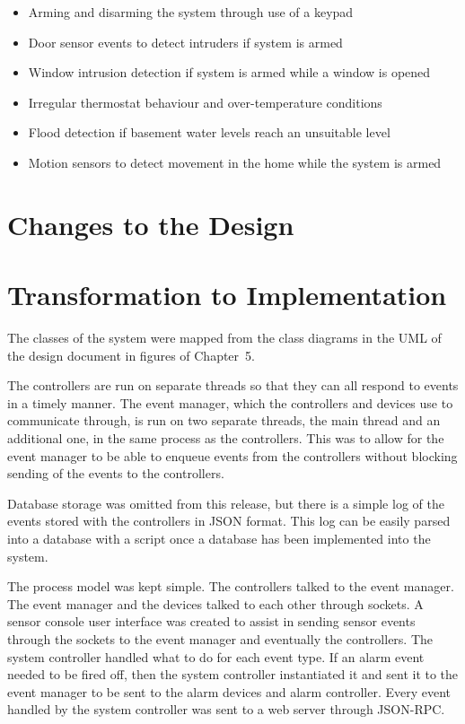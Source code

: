 \documentclass{article}
\begin{document}
\begin{itemize}
\item Arming and disarming the system through use of a keypad
\item Door sensor events to detect intruders if system is armed
\item Window intrusion detection if system is armed while a window is opened
\item Irregular thermostat behaviour and over-temperature conditions
\item Flood detection if basement water levels reach an unsuitable level
\item Motion sensors to detect movement in the home while the system is armed
\end{itemize}


\section{Changes to the Design} %

\section{Transformation to Implementation} %

The classes of the system were mapped from the class diagrams in the UML of the
design document in figures of Chapter~5. 

The controllers are run on separate threads so that they can all respond to
events in a timely manner. The event manager, which the controllers and devices
use to communicate through, is run on two separate threads, the main thread and
an additional one, in the same process as the controllers. This was to allow
for the event manager to be able to enqueue events from the controllers without
blocking sending of the events to the controllers.

Database storage was omitted from this release, but there is a simple log of
the events stored with the controllers in JSON format. This log can be easily
parsed into a database with a script once a database has been implemented into
the system.

The process model was kept simple. The controllers talked to the event manager.
The event manager and the devices talked to each other through sockets. A
sensor console user interface was created to assist in sending sensor events
through the sockets to the event manager and eventually the controllers. The
system controller handled what to do for each event type. If an alarm event
needed to be fired off, then the system controller instantiated it and sent it
to the event manager to be sent to the alarm devices and alarm controller.
Every event handled by the system controller was sent to a web server through
JSON-RPC. 
\end{document}
